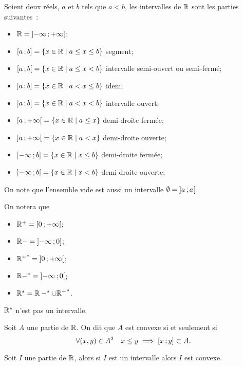 \begin{defdef}
  Soient deux réels, $a$ et $b$ tels que $a<b$, les intervalles de $\mathbb{R}$ sont les parties suivantes~:
  \begin{itemize}
  \item $\mathbb{R}=\left] -\infty \, ;  +\infty \right[$;
  \item $\left[ a \, ;  b \right]=\left\{x \in \mathbb{R}\mathrel{}\middle|\mathrel{}a\leq x \leq b\right\}$ segment;
  \item $\left[ a \, ;  b \right[=\left\{x \in \mathbb{R}\mathrel{}\middle|\mathrel{}a\leq x < b\right\}$ intervalle semi-ouvert ou semi-fermé;
  \item $\left] a \, ;  b \right]=\left\{x \in \mathbb{R}\mathrel{}\middle|\mathrel{}a< x \leq b\right\}$ idem;
  \item $\left] a \, ;  b \right[=\left\{x \in \mathbb{R}\mathrel{}\middle|\mathrel{}a< x < b\right\}$ intervalle ouvert;
  \item $\left[ a \, ;  +\infty \right[=\left\{x \in \mathbb{R}\mathrel{}\middle|\mathrel{}a\leq x\right\}$ demi-droite fermée;
  \item $\left] a \, ;  +\infty \right[=\left\{x \in \mathbb{R}\mathrel{}\middle|\mathrel{}a< x\right\}$ demi-droite ouverte;
  \item $\left] -\infty \, ;  b \right]=\left\{x \in \mathbb{R}\mathrel{}\middle|\mathrel{}x \leq b\right\}$ demi-droite fermée;
  \item $\left] -\infty \, ;  b \right[=\left\{x \in \mathbb{R}\mathrel{}\middle|\mathrel{}x <b\right\}$ demi-droite ouverte;
  \end{itemize}
\end{defdef}
On note que l'ensemble vide est aussi un intervalle $\emptyset=\left] a \, ;  a \right[$.
\begin{defdef}
  On notera que
  \begin{itemize}
  \item $\mathbb{R}^{+}=\left[ 0 \, ;  +\infty \right[$;
  \item $\mathbb{R}-=\left] -\infty \, ;  0 \right]$;
  \item ${\mathbb{R}^{+}}^*=\left] 0 \, ;  +\infty \right[$;
  \item $\mathbb{R}-^*=\left] -\infty \, ;  0 \right[$;
  \item $\mathbb{R}^*=\mathbb{R}-^* \cup {\mathbb{R}^{+}}^*$.
  \end{itemize}
  $\mathbb{R}^*$ n'est pas un intervalle.
\end{defdef}
\begin{defdef}
  Soit $A$ une partie de $\mathbb{R}$. On dit que $A$ est convexe si et seulement si
  \begin{equation}
    \forall (x,y) \in A^2 \quad x\leq y \implies \left[ x \, ;  y \right]\subset A.
  \end{equation}
\end{defdef}
\begin{theo}
  \label{theo:partieconvexe1}
  Soit $I$ une partie de $\mathbb{R}$, alors si $I$ est un intervalle alors $I$ est convexe.
\end{theo}
